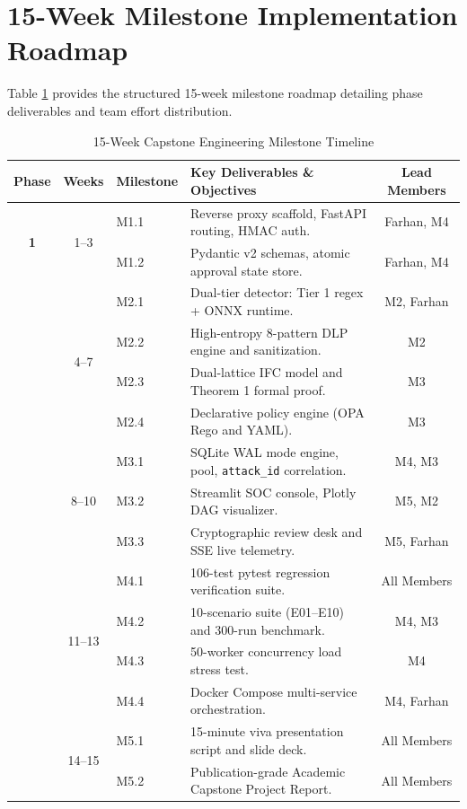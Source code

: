 \section{15-Week Milestone Implementation Roadmap}
Table \ref{tab:wbs_timeline} provides the structured 15-week milestone roadmap detailing phase deliverables and team effort distribution.

\begin{table}[htbp]
\centering
\small
\caption{15-Week Capstone Engineering Milestone Timeline}
\label{tab:wbs_timeline}
\begin{tabularx}{\textwidth}{cclp{5.5cm}c}
\toprule
\textbf{Phase} & \textbf{Weeks} & \textbf{Milestone} & \textbf{Key Deliverables \& Objectives} & \textbf{Lead Members} \\
\midrule
\multirow{2}{*}{\textbf{1}} & \multirow{2}{*}{1--3} & M1.1 & Reverse proxy scaffold, FastAPI routing, HMAC auth. & Farhan, M4 \\
 & & M1.2 & Pydantic v2 schemas, atomic approval state store. & Farhan, M4 \\
\addlinespace
\multirow{4}{*}{\textbf{2}} & \multirow{4}{*}{4--7} & M2.1 & Dual-tier detector: Tier 1 regex + ONNX runtime. & M2, Farhan \\
 & & M2.2 & High-entropy 8-pattern DLP engine and sanitization. & M2 \\
 & & M2.3 & Dual-lattice IFC model and Theorem 1 formal proof. & M3 \\
 & & M2.4 & Declarative policy engine (OPA Rego and YAML). & M3 \\
\addlinespace
\multirow{3}{*}{\textbf{3}} & \multirow{3}{*}{8--10} & M3.1 & SQLite WAL mode engine, pool, \texttt{attack\_id} correlation. & M4, M3 \\
 & & M3.2 & Streamlit SOC console, Plotly DAG visualizer. & M5, M2 \\
 & & M3.3 & Cryptographic review desk and SSE live telemetry. & M5, Farhan \\
\addlinespace
\multirow{4}{*}{\textbf{4}} & \multirow{4}{*}{11--13} & M4.1 & 106-test pytest regression verification suite. & All Members \\
 & & M4.2 & 10-scenario suite (E01--E10) and 300-run benchmark. & M4, M3 \\
 & & M4.3 & 50-worker concurrency load stress test. & M4 \\
 & & M4.4 & Docker Compose multi-service orchestration. & M4, Farhan \\
\addlinespace
\multirow{2}{*}{\textbf{5}} & \multirow{2}{*}{14--15} & M5.1 & 15-minute viva presentation script and slide deck. & All Members \\
 & & M5.2 & Publication-grade Academic Capstone Project Report. & All Members \\
\bottomrule
\end{tabularx}
\end{table}

